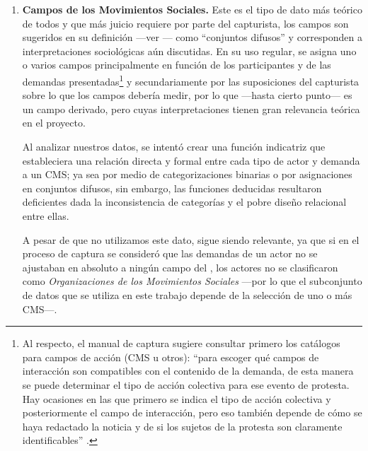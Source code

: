 \documentclass[letterpaper, 11pt]{book}
\theoremstyle{definition}
\theoremstyle{remark}
\begin{document}
\begin{enumerate}
    \item \textbf{Campos de los Movimientos Sociales.} Este es el tipo de dato más teórico de todos y que más juicio requiere por parte del capturista, los campos son sugeridos en su definición ---ver --- como ``conjuntos difusos'' y corresponden a interpretaciones sociológicas aún discutidas.
    En su uso regular, se asigna uno o varios campos principalmente en función de los participantes y de las demandas presentadas\footnote{
    Al respecto, el manual de captura sugiere consultar primero los catálogos para campos de acción (CMS u otros): ``para escoger qué campos de interacción son compatibles con el contenido de la demanda, de esta manera se puede determinar el tipo de acción colectiva para ese evento de protesta. 
    Hay ocasiones en las que primero se indica el tipo de acción colectiva y posteriormente el campo de interacción, pero eso también depende de cómo se haya redactado la noticia y de si los sujetos de la protesta son claramente identificables'' \citep[17]{2017_Cadena_ManualLAOMS}.} y secundariamente por las suposiciones del capturista sobre lo que los campos debería medir, por lo que ---hasta cierto punto--- es un campo derivado, pero cuyas interpretaciones tienen gran relevancia teórica en el proyecto. 
    
    Al analizar nuestros datos, se intentó crear una función indicatriz que estableciera una relación directa y formal entre cada tipo de actor y demanda a un CMS; ya sea por medio de categorizaciones binarias o por asignaciones en conjuntos difusos, sin embargo, las funciones deducidas resultaron deficientes dada la inconsistencia de categorías y el pobre diseño relacional entre ellas. 
    
    A pesar de que no utilizamos este dato, sigue siendo relevante, ya que si en el proceso de captura se consideró que las demandas de un actor no se ajustaban en absoluto a ningún campo del , los actores no se clasificaron como \emph{Organizaciones de los Movimientos Sociales} ---por lo que el subconjunto de datos que se utiliza en este trabajo depende de la selección de uno o más CMS---.
    


\end{enumerate}
\end{document}
